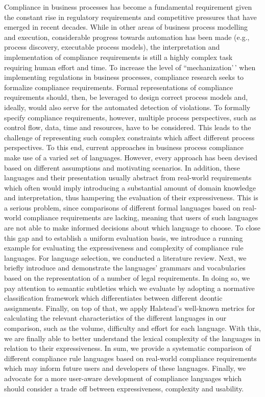 \documentclass[
  letterpaper,
  DIV=11,
  numbers=noendperiod]{scrartcl}
\begin{document}
Compliance in business processes has become a fundamental requirement
given the constant rise in regulatory requirements and competitive
pressures that have emerged in recent decades. While in other areas of
business process modelling and execution, considerable progress towards
automation has been made (e.g., process discovery, executable process
models), the interpretation and implementation of compliance
requirements is still a highly complex task requiring human effort and
time. To increase the level of ``mechanization'\,' when implementing
regulations in business processes, compliance research seeks to
formalize compliance requirements. Formal representations of compliance
requirements should, then, be leveraged to design correct process models
and, ideally, would also serve for the automated detection of
violations. To formally specify compliance requirements, however,
multiple process perspectives, such as control flow, data, time and
resources, have to be considered. This leads to the challenge of
representing such complex constraints which affect different process
perspectives. To this end, current approaches in business process
compliance make use of a varied set of languages. However, every
approach has been devised based on different assumptions and motivating
scenarios. In addition, these languages and their presentation usually
abstract from real-world requirements which often would imply
introducing a substantial amount of domain knowledge and interpretation,
thus hampering the evaluation of their expressiveness. This is a serious
problem, since comparisons of different formal languages based on
real-world compliance requirements are lacking, meaning that users of
such languages are not able to make informed decisions about which
language to choose. To close this gap and to establish a uniform
evaluation basis, we introduce a running example for evaluating the
expressiveness and complexity of compliance rule languages. For language
selection, we conducted a literature review. Next, we briefly introduce
and demonstrate the languages' grammars and vocabularies based on the
representation of a number of legal requirements. In doing so, we pay
attention to semantic subtleties which we evaluate by adopting a
normative classification framework which differentiates between
different deontic assignments. Finally, on top of that, we apply
Halstead's well-known metrics for calculating the relevant
characteristics of the different languages in our comparison, such as
the volume, difficulty and effort for each language. With this, we are
finally able to better understand the lexical complexity of the
languages in relation to their expressiveness. In sum, we provide a
systematic comparison of different compliance rule languages based on
real-world compliance requirements which may inform future users and
developers of these languages. Finally, we advocate for a more
user-aware development of compliance languages which should consider a
trade off between expressiveness, complexity and usability.
\end{document}
